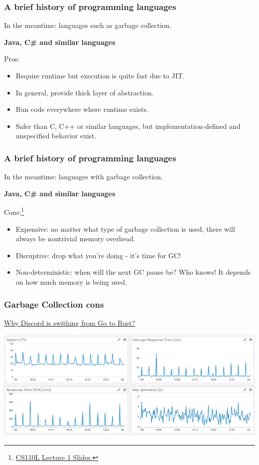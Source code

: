 \documentclass[aspectratio=1610,t]{beamer}
\begin{document}

\begin{frame}
\frametitle{A brief history of programming languages}
In the meantime: languages such as garbage collection.

\textbf{Java, C\# and similar languages}

Pros:
\begin{itemize}
    \item Require runtime but execution is quite fast due to JIT.
    \item In general, provide thick layer of abstraction.
    \item Run code everywhere where runtime exists.
    \item Safer than C, C++ or similar languages, but implementation-defined and unspecified behavior exist.
\end{itemize}
\end{frame}


\begin{frame}
\frametitle{A brief history of programming languages}
In the meantime: languages with garbage collection.

\textbf{Java, C\# and similar languages}

Cons:\footnote{\href{https://reberhardt.com/cs110l/spring-2020/slides/lecture-01.pdf}{CS110L Lecture 1 Slides.}}
\begin{itemize}
    \item Expensive: no matter what type of garbage collection is used, there will always be nontrivial memory overhead.
    \item Disruptive: drop what you're doing - it's time for GC!
    \item Non-deterministic: when will the next GC pause be? Who knows! It depends on how much memory is being used.
\end{itemize}
\end{frame}


\begin{frame}
\frametitle{Garbage Collection cons}
\href{https://discord.com/blog/why-discord-is-switching-from-go-to-rust}{Why Discord is swithing from Go to Rust?}

\includegraphics[width=\textwidth,height=\textheight,keepaspectratio]{images/discord-spikes.png}

\end{frame}
\end{document}
